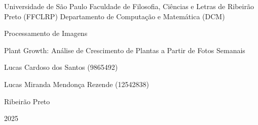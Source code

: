 \begin{center} 
    Universidade de São Paulo \linebreak
    Faculdade de Filosofia, Ciências e Letras de Ribeirão Preto (FFCLRP) \linebreak
    Departamento de Computação e Matemática (DCM)
    
    \vfill
    
    \Large Processamento de Imagens %
    
    \Huge Plant Growth: Análise de Crescimento de Plantas a Partir de Fotos Semanais %
    
    \normalsize
    \vfill
    
    Lucas Cardoso dos Santos (9865492)

    Lucas Miranda Mendonça Rezende (12542838)

    \vfill
    
    Ribeirão Preto
    
    2025
    
\end{center} %